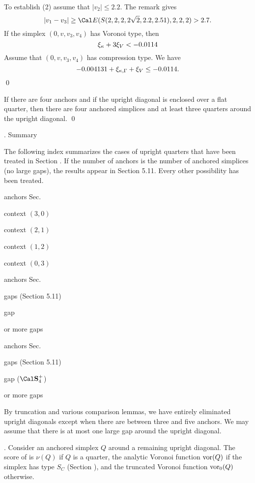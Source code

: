 To establish (2) assume that $|v_2|\le 2.2$.
The remark gives 
$$|v_1-v_3|\ge \Cal E(S(2,2,2,2\sqrt{2},2.2,2.51),2,2,2)>2.7.$$
  If the simplex
$(0,v,v_3,v_4)$ has Voronoi type, then
$$\xi_\kappa + 3\xi_V  < -0.0114$$
Assume that $(0,v,v_3,v_4)$ has compression type.  
We have
$$-0.004131 +\xi_{\kappa,\Gamma} + \xi_V \le -0.0114.$$\qed
\enddemo

  If there are four anchors and if
the upright diagonal is enclosed over a flat quarter, then there
are four anchored simplices and at least three quarters around the
upright diagonal.
\qed
\endproclaim

\subhead {}. Summary\endsubhead

The following index summarizes the cases of upright quarters
that have been treated in Section .
If the number of anchors is the number of anchored simplices (no
large gaps), the results appear in Section 5.11.  
Every other possibility has been treated.


 anchors \hfill Sec. 

\quad\cir context $(3,0)$

\quad\cir context $(2,1)$

\quad\cir context $(1,2)$

\quad\cir context $(0,3)$

 anchors \hfill Sec. 

\quad {} gaps (Section 5.11)

\quad{} gap 

\quad{} or more gaps

 anchors \hfill Sec. 

\quad{} gaps (Section 5.11)

\quad{} gap ($\Sfour$)

\quad{} or more gaps



\smallskip
By truncation and various comparison lemmas,
we have entirely eliminated upright diagonals except when
there are between three and five anchors.  We may assume that there is at most one
large gap around the upright diagonal.  

\smallskip
{}.  Consider an anchored simplex $Q$ around a remaining upright diagonal.
The score of is $\nu(Q)$ if $Q$ is a quarter, the analytic
Voronoi function $\operatorname{vor}(Q)$ if the
simplex has type $S_C$ (Section ),
and the truncated Voronoi function $\operatorname{vor}_0(Q)$ otherwise.

